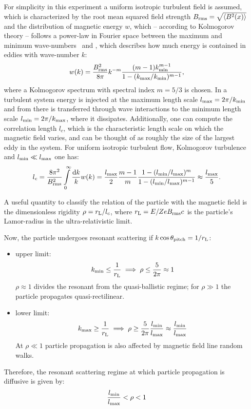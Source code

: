 For simplicity in this experiment a uniform isotropic turbulent field is
assumed, which is characterized by the root mean squared field strength
$B_{\mathrm{rms}}=\sqrt{\langle{B^2(x)}\rangle}$ and the distribution of magnetic energy
$w$, which -- according to Kolmogorov theory -- follows a power-law in Fourier
space between the maximum and minimum wave-numbers \kmin~and \kmax, which
describes how much energy is contained in eddies with wave-number $k$:
\begin{equation}
    w(k)=\frac{B_{\mathrm{rms}}^2}{8\pi}k^{-m}\frac{(m-1)k_{\mathrm{min}}^{m-1}}{1-(k_{\mathrm{max}}/k_{\mathrm{min}})^{m-1}},
\end{equation}
where a Kolmogorov spectrum with spectral index $m=5/3$ is chosen.
In a turbulent system energy is injected at the maximum length scale
$l_{\mathrm{max}}=2\pi/k_{\mathrm{min}}$ and from there is transferred through wave interactions to
the minimum length scale $l_{\mathrm{min}}=2\pi/k_{\mathrm{max}}$, where it dissipates.
Additionally, one can compute the correlation length $l_c$, which is the
characteristic length scale on which the magnetic field varies, and can be
thought of as roughly the size of the largest eddy in the system. For uniform
isotropic turbulent flow, Kolmogorov turbulence and $l_{\mathrm{min}}\ll l_{\mathrm{max}}$ one has:
\begin{equation}
    l_c=\frac{8\pi^2}{B_{\mathrm{rms}}^2}\int\limits_{0}^{\infty}\frac{\dd{k}}{k}w(k)
    =\frac{l_{\mathrm{max}}}{2}\frac{m-1}{m}\frac{1-(l_{\mathrm{min}}/l_{\mathrm{max}})^m}{1-(l_{\mathrm{min}}/l_{\mathrm{max}})^{m-1}}
    \approx\frac{l_{\mathrm{max}}}{5}.
\end{equation}

A useful quantity to classify the relation of the particle with the magnetic
field is the dimensionless rigidity $\rho=r_{\mathrm{L}}/l_c$, where $r_{\mathrm{L}}=E/ZeB_{\mathrm{rms}}
c$ is the particle's Lamor-radius in the ultra-relativistic limit.

Now, the particle undergoes resonant scattering if $k\cos\theta_{\mathrm{pitch}}=1/r_{\mathrm{L}}$:
\begin{itemize}
    \item upper limit:
        \[k_{\mathrm{min}}\le\frac{1}{r_{\mathrm{L}}} \implies \rho\le\frac{5}{2\pi}\approx1\]
        $\rho\approx1$ divides the resonant from the quasi-ballistic regime; for
        $\rho\gg1$ the particle propagates quasi-rectilinear.
    \item lower limit:
        \[k_{\mathrm{max}}\ge\frac{1}{r_{\mathrm{L}}} \implies
            \rho\ge\frac{5}{2\pi}\frac{l_{\mathrm{min}}}{l_{\mathrm{max}}}\approx\frac{l_{\mathrm{min}}}{l_{\mathrm{max}}}\]
        At $\rho\ll1$ particle propagation is also affected by magnetic field
        line random walks.
\end{itemize}
Therefore, the resonant scattering regime at which particle propagation is
diffusive is given by:
\begin{equation}
    \frac{l_{\mathrm{min}}}{l_{\mathrm{max}}}<\rho<1
    \label{eq:resontant-scattering}
\end{equation}


